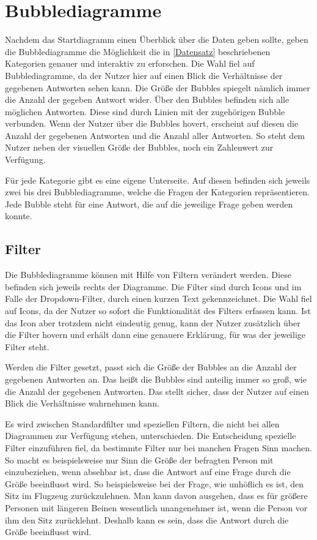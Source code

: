 \documentclass{scrartcl}
\begin{document}
\section{Bubblediagramme}
Nachdem das Startdiagramm einen Überblick über die Daten geben sollte, geben die Bubblediagramme die Möglichkeit die in \ref{Datensatz} beschriebenen Kategorien genauer und interaktiv zu erforschen.
Die Wahl fiel auf Bubblediagramme, da der Nutzer hier auf einen Blick die Verhältnisse der gegebenen Antworten sehen kann. Die Größe der Bubbles spiegelt nämlich immer die Anzahl der gegeben Antwort wider. Über den Bubbles befinden sich alle möglichen Antworten. Diese sind durch Linien mit der zugehörigen Bubble verbunden. Wenn der Nutzer über die Bubbles hovert, erscheint auf diesen die Anzahl der gegebenen Antworten und die Anzahl aller Antworten. So steht dem Nutzer neben der visuellen Größe der Bubbles, noch ein Zahlenwert zur Verfügung. 

Für jede Kategorie gibt es eine eigene Unterseite. Auf diesen befinden sich jeweils zwei bis drei Bubblediagramme, welche die Fragen der Kategorien repräsentieren. Jede Bubble steht für eine Antwort, die auf die jeweilige Frage geben werden konnte. 

\subsection{Filter}
Die Bubblediagramme können mit Hilfe von Filtern verändert werden. Diese befinden sich jeweils rechts der Diagramme. Die Filter sind durch Icons und im Falle der Dropdown-Filter, durch einen kurzen Text gekennzeichnet. Die Wahl fiel auf Icons, da der Nutzer so sofort die Funktionalität des Filters erfassen kann. Ist das Icon aber trotzdem nicht eindeutig genug, kann der Nutzer zusätzlich über die Filter hovern und erhält dann eine genauere Erklärung, für was der jeweilige Filter steht. 

Werden die Filter gesetzt, passt sich die Größe der Bubbles an die Anzahl der gegebenen Antworten an. Das heißt die Bubbles sind anteilig immer so groß, wie die Anzahl der gegebenen Antworten. Das stellt sicher, dass der Nutzer auf einen Blick die Verhältnisse wahrnehmen kann.  

Es wird zwischen Standardfilter und speziellen Filtern, die nicht bei allen Diagrammen zur Verfügung stehen, unterschieden. Die Entscheidung spezielle Filter einzuführen fiel, da bestimmte Filter nur bei manchen Fragen Sinn machen. So macht es beispielsweise nur Sinn die Größe der befragten Person mit einzubeziehen, wenn absehbar ist, dass die Antwort auf eine Frage durch die Größe beeinflusst wird. So beispielsweise bei der Frage, wie unhöflich es ist, den Sitz im Flugzeug zurückzulehnen. Man kann davon ausgehen, dass es für größere Personen mit längeren Beinen wesentlich unangenehmer ist, wenn die Person vor ihm den Sitz zurücklehnt. Deshalb kann es sein, dass die Antwort durch die Größe beeinflusst wird.
\end{document}
